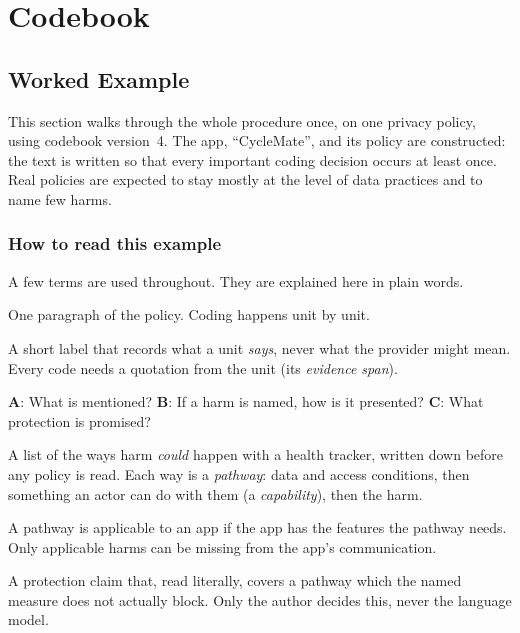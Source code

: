 \chapter{Codebook}
\label{app:codebook}

\section{Worked Example}
\label{app:worked-example}

This section walks through the whole procedure once, on one privacy policy,
using codebook version~4. The app, \enquote{CycleMate}, and its policy are
constructed: the text is written so that every important coding decision
occurs at least once. Real policies are expected to stay mostly at the level
of data practices and to name few harms.

\subsection*{How to read this example}

A few terms are used throughout. They are explained here in plain words.

\begin{description}[leftmargin=0pt,itemsep=2pt]
  \item[Unit.] One paragraph of the policy. Coding happens unit by unit.
  \item[Code.] A short label that records what a unit \emph{says}, never what
    the provider might mean. Every code needs a quotation from the unit
    (its \emph{evidence span}).
  \item[Three questions (axes).] \textbf{A}: What is mentioned? \textbf{B}: If
    a harm is named, how is it presented? \textbf{C}: What protection is
    promised?
  \item[Reference tree.] A list of the ways harm \emph{could} happen with a
    health tracker, written down before any policy is read. Each way is a
    \emph{pathway}: data and access conditions, then something an actor
    can do with them (a \emph{capability}), then the harm.
  \item[Applicable.] A pathway is applicable to an app if the app has the
    features the pathway needs. Only applicable harms can be missing from the
    app's communication.
  \item[Potential mismatch.] A protection claim that, read literally, covers
    a pathway which the named measure does not actually block. Only the author
    decides this, never the language model.
\end{description}

